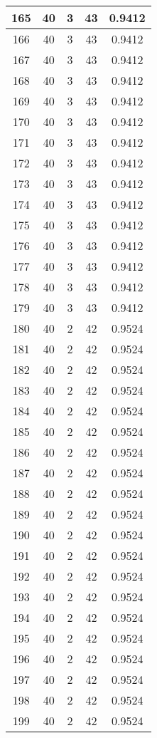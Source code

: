 \documentclass[letterpaper, 12pt]{article}
\begin{document}
\begin{longtable}{|c|c|c|c|c|}
\hline
165 & 40 & 3 & 43 & 0.9412 \\
\hline
166 & 40 & 3 & 43 & 0.9412 \\
\hline
167 & 40 & 3 & 43 & 0.9412 \\
\hline
168 & 40 & 3 & 43 & 0.9412 \\
\hline
169 & 40 & 3 & 43 & 0.9412 \\
\hline
170 & 40 & 3 & 43 & 0.9412 \\
\hline
171 & 40 & 3 & 43 & 0.9412 \\
\hline
172 & 40 & 3 & 43 & 0.9412 \\
\hline
173 & 40 & 3 & 43 & 0.9412 \\
\hline
174 & 40 & 3 & 43 & 0.9412 \\
\hline
175 & 40 & 3 & 43 & 0.9412 \\
\hline
176 & 40 & 3 & 43 & 0.9412 \\
\hline
177 & 40 & 3 & 43 & 0.9412 \\
\hline
178 & 40 & 3 & 43 & 0.9412 \\
\hline
179 & 40 & 3 & 43 & 0.9412 \\
\hline
180 & 40 & 2 & 42 & 0.9524 \\
\hline
181 & 40 & 2 & 42 & 0.9524 \\
\hline
182 & 40 & 2 & 42 & 0.9524 \\
\hline
183 & 40 & 2 & 42 & 0.9524 \\
\hline
184 & 40 & 2 & 42 & 0.9524 \\
\hline
185 & 40 & 2 & 42 & 0.9524 \\
\hline
186 & 40 & 2 & 42 & 0.9524 \\
\hline
187 & 40 & 2 & 42 & 0.9524 \\
\hline
188 & 40 & 2 & 42 & 0.9524 \\
\hline
189 & 40 & 2 & 42 & 0.9524 \\
\hline
190 & 40 & 2 & 42 & 0.9524 \\
\hline
191 & 40 & 2 & 42 & 0.9524 \\
\hline
192 & 40 & 2 & 42 & 0.9524 \\
\hline
193 & 40 & 2 & 42 & 0.9524 \\
\hline
194 & 40 & 2 & 42 & 0.9524 \\
\hline
195 & 40 & 2 & 42 & 0.9524 \\
\hline
196 & 40 & 2 & 42 & 0.9524 \\
\hline
197 & 40 & 2 & 42 & 0.9524 \\
\hline
198 & 40 & 2 & 42 & 0.9524 \\
\hline
199 & 40 & 2 & 42 & 0.9524 \\
\hline
\end{longtable}
\end{document}
